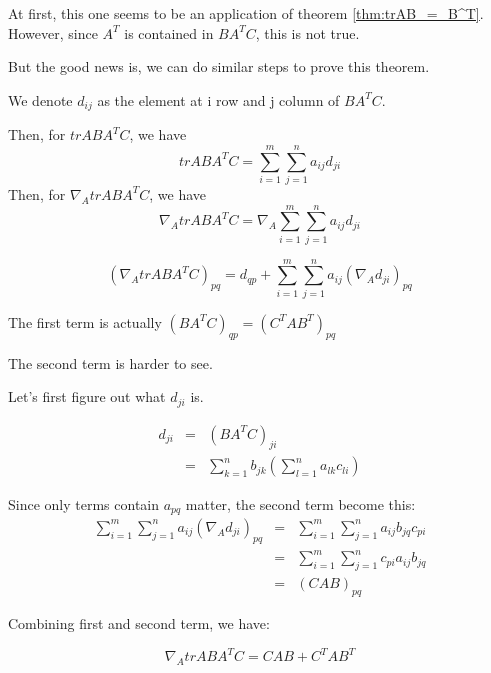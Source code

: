 \documentclass[a4paper]{book}
\newenvironment{proof}[1][Proof]{\begin{trivlist}
\item[\hskip \labelsep {\bfseries #1}]}{\end{trivlist}}
\newcommand{\qed}{\nobreak \ifvmode \relax \else
      \ifdim\lastskip<1.5em \hskip-\lastskip
      \hskip1.5em plus0em minus0.5em \fi \nobreak
      \vrule height0.75em width0.5em depth0.25em\fi}
\begin{document}
      \begin{proof}
        At first, this one seems to be an application of theorem
        \ref{thm:trAB_=_B^T}. However, since $A^T$ is contained in $BA^TC$,
        this is not true.

        But the good news is, we can do similar steps to prove this theorem.

        We denote $d_{ij}$ as the element at i row and j column of $BA^TC$.

        Then, for $trABA^TC$, we have
        \begin{displaymath}
          trABA^TC = \sum\limits^{m}_{i=1}\sum\limits^{n}_{j=1}a_{ij}d_{ji}
        \end{displaymath}
        Then, for $\nabla_A trABA^TC$, we have
        \begin{displaymath}
          \nabla_A trABA^TC = \nabla_A \sum\limits^{m}_{i=1}\sum\limits^{n}_{j=1}a_{ij}d_{ji}
        \end{displaymath}

        \begin{displaymath}
          (\nabla_A trABA^TC)_{pq} = d_{qp} +
          \sum\limits^{m}_{i=1}\sum\limits^{n}_{j=1}a_{ij}(\nabla_A
          d_{ji})_{pq}
        \end{displaymath}

        The first term is actually $(BA^TC)_{qp} = (C^TAB^T)_{pq}$

        The second term is harder to see.

        Let's first figure out what $d_{ji}$ is.

        \begin{eqnarray}
          d_{ji}  & = & (BA^TC)_{ji} \nonumber\\
          & = &
          \sum\limits^{n}_{k=1}b_{jk}(\sum\limits^{n}_{l=1}a_{lk}c_{li})
          \nonumber
        \end{eqnarray}

        Since only terms contain $a_{pq}$ matter, the second term become
        this:
        \begin{eqnarray}
          \sum\limits^{m}_{i=1}\sum\limits^{n}_{j=1}a_{ij}(\nabla_A
          d_{ji})_{pq} & = &
              \sum\limits^{m}_{i=1}\sum\limits^{n}_{j=1}a_{ij}b_{jq}c_{pi}
              \nonumber\\
              & = & \sum\limits^{m}_{i=1}\sum\limits^{n}_{j=1}c_{pi}a_{ij}b_{jq}
              \nonumber\\
              & = & (CAB)_{pq} \nonumber
        \end{eqnarray}

        Combining first and second term, we have:

        \begin{displaymath}
          \nabla_A trABA^TC = CAB + C^TAB^T
        \end{displaymath}
        \qed

      \end{proof}
\end{document}
